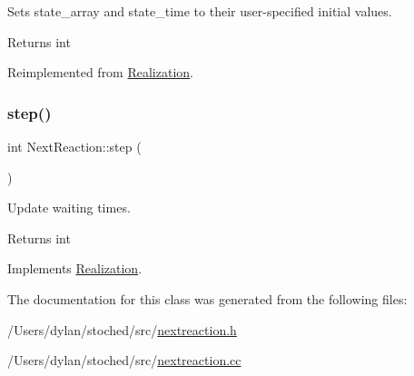Sets state\+\_\+array and state\+\_\+time to their user-\/specified initial values. 

\begin{DoxyReturn}{Returns}
int 
\end{DoxyReturn}


Reimplemented from \hyperlink{class_realization_a391a89af7574a9053f53f8a299c2cc70}{Realization}.

\mbox{\label{class_next_reaction_a2c1502879c76efe398c2947056936725}} 
\subsubsection{\texorpdfstring{step()}{step()}}
{\footnotesize\ttfamily int Next\+Reaction\+::step (\begin{DoxyParamCaption}{ }\end{DoxyParamCaption})\hspace{0.3cm}{\ttfamily [virtual]}}



Update waiting times. 

\begin{DoxyReturn}{Returns}
int 
\end{DoxyReturn}


Implements \hyperlink{class_realization_a9949217117927b149850288f3b74c9ef}{Realization}.



The documentation for this class was generated from the following files\+:\begin{DoxyCompactItemize}
\item 
/\+Users/dylan/stoched/src/\hyperlink{nextreaction_8h}{nextreaction.\+h}\item 
/\+Users/dylan/stoched/src/\hyperlink{nextreaction_8cc}{nextreaction.\+cc}\end{DoxyCompactItemize}
